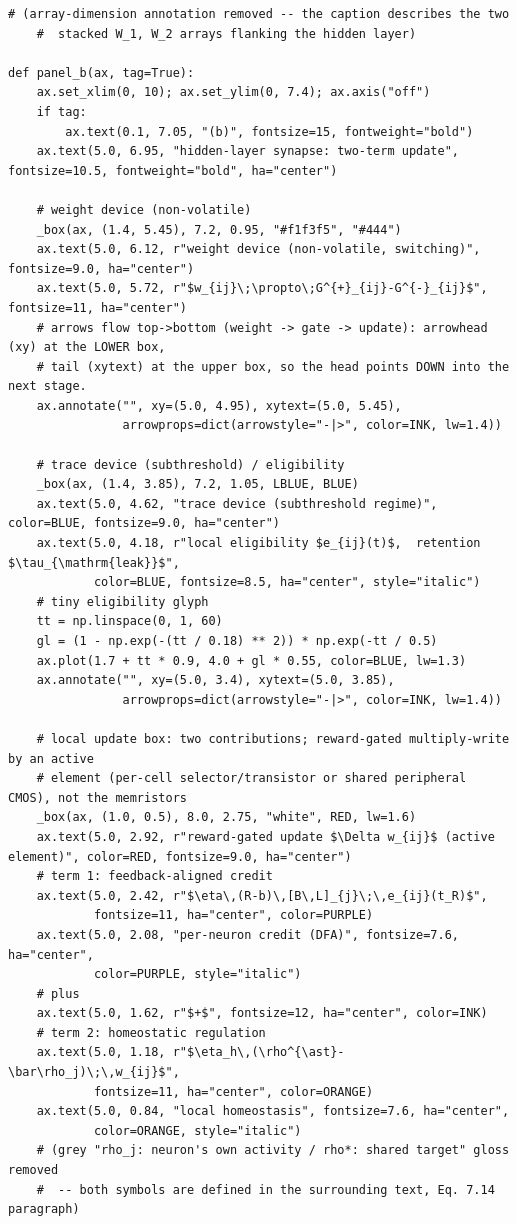 \begin{lstlisting}[caption={schematics.ipynb code cell 8},label={lst:mrl-nb-schematics-8}]
    # (array-dimension annotation removed -- the caption describes the two
    #  stacked W_1, W_2 arrays flanking the hidden layer)

def panel_b(ax, tag=True):
    ax.set_xlim(0, 10); ax.set_ylim(0, 7.4); ax.axis("off")
    if tag:
        ax.text(0.1, 7.05, "(b)", fontsize=15, fontweight="bold")
    ax.text(5.0, 6.95, "hidden-layer synapse: two-term update", fontsize=10.5, fontweight="bold", ha="center")

    # weight device (non-volatile)
    _box(ax, (1.4, 5.45), 7.2, 0.95, "#f1f3f5", "#444")
    ax.text(5.0, 6.12, r"weight device (non-volatile, switching)", fontsize=9.0, ha="center")
    ax.text(5.0, 5.72, r"$w_{ij}\;\propto\;G^{+}_{ij}-G^{-}_{ij}$", fontsize=11, ha="center")
    # arrows flow top->bottom (weight -> gate -> update): arrowhead (xy) at the LOWER box,
    # tail (xytext) at the upper box, so the head points DOWN into the next stage.
    ax.annotate("", xy=(5.0, 4.95), xytext=(5.0, 5.45),
                arrowprops=dict(arrowstyle="-|>", color=INK, lw=1.4))

    # trace device (subthreshold) / eligibility
    _box(ax, (1.4, 3.85), 7.2, 1.05, LBLUE, BLUE)
    ax.text(5.0, 4.62, "trace device (subthreshold regime)", color=BLUE, fontsize=9.0, ha="center")
    ax.text(5.0, 4.18, r"local eligibility $e_{ij}(t)$,  retention $\tau_{\mathrm{leak}}$",
            color=BLUE, fontsize=8.5, ha="center", style="italic")
    # tiny eligibility glyph
    tt = np.linspace(0, 1, 60)
    gl = (1 - np.exp(-(tt / 0.18) ** 2)) * np.exp(-tt / 0.5)
    ax.plot(1.7 + tt * 0.9, 4.0 + gl * 0.55, color=BLUE, lw=1.3)
    ax.annotate("", xy=(5.0, 3.4), xytext=(5.0, 3.85),
                arrowprops=dict(arrowstyle="-|>", color=INK, lw=1.4))

    # local update box: two contributions; reward-gated multiply-write by an active
    # element (per-cell selector/transistor or shared peripheral CMOS), not the memristors
    _box(ax, (1.0, 0.5), 8.0, 2.75, "white", RED, lw=1.6)
    ax.text(5.0, 2.92, r"reward-gated update $\Delta w_{ij}$ (active element)", color=RED, fontsize=9.0, ha="center")
    # term 1: feedback-aligned credit
    ax.text(5.0, 2.42, r"$\eta\,(R-b)\,[B\,L]_{j}\;\,e_{ij}(t_R)$",
            fontsize=11, ha="center", color=PURPLE)
    ax.text(5.0, 2.08, "per-neuron credit (DFA)", fontsize=7.6, ha="center",
            color=PURPLE, style="italic")
    # plus
    ax.text(5.0, 1.62, r"$+$", fontsize=12, ha="center", color=INK)
    # term 2: homeostatic regulation
    ax.text(5.0, 1.18, r"$\eta_h\,(\rho^{\ast}-\bar\rho_j)\;\,w_{ij}$",
            fontsize=11, ha="center", color=ORANGE)
    ax.text(5.0, 0.84, "local homeostasis", fontsize=7.6, ha="center",
            color=ORANGE, style="italic")
    # (grey "rho_j: neuron's own activity / rho*: shared target" gloss removed
    #  -- both symbols are defined in the surrounding text, Eq. 7.14 paragraph)


\end{lstlisting}
